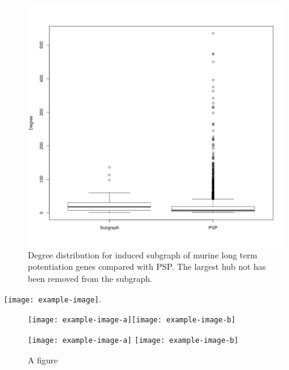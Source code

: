 \begin{figure}
    \centering
    \includegraphics[width=\textwidth]{images/Rplot_boxplot_subgraph_and_PSP_degree.png}
    \caption{Degree distribution for induced subgraph of murine long term potentiation genes compared with PSP. The largest hub not has been removed from the subgraph.}
    \label{fig:Degree distribution for induced subgraph of murine long term potentiation genes compared with PSP. The largest hub not has been removed from the subgraph}
\end{figure}







\texttt{[image: example-image]}.
\begin{figure}
\texttt{[image: example-image-a]}\texttt{[image: example-image-b]}

\texttt{[image: example-image-a]} \texttt{[image: example-image-b]}
\caption{A figure}

\end{figure}
